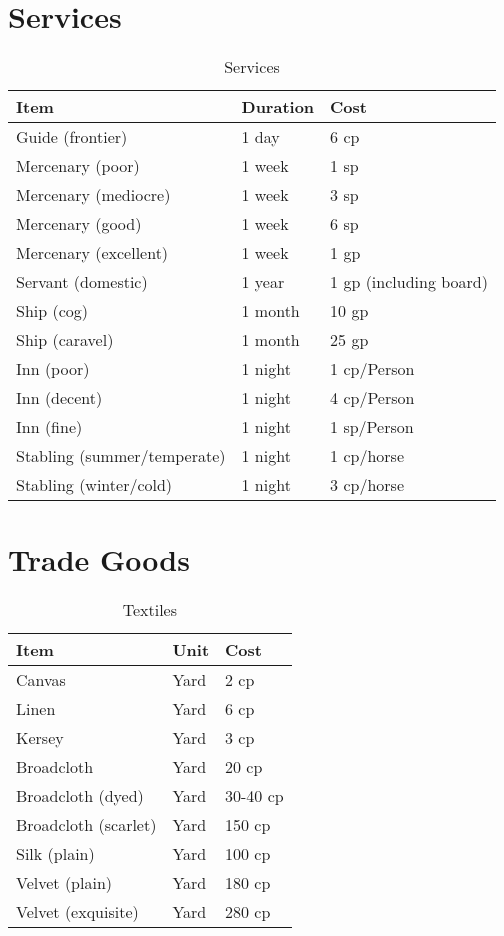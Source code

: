 \documentclass[oneside,11pt,english]{book}
\begin{document}
\section{Services}
\begin{table}[hb]
	\centering
	\caption{Services}
	\label{tab:Services}
	\begin{tabu} spread 0pt {*{3}{X[-1]}}
		Item &Duration &Cost\\\toprule
Guide (frontier) &1 day &6 cp\\
Mercenary (poor) &1 week &1 sp\\
Mercenary (mediocre) &1 week &3 sp\\
Mercenary (good) &1 week &6 sp\\
Mercenary (excellent) &1 week &1 gp\\
Servant (domestic) &1 year &1 gp (including board)\\
Ship (cog) &1 month &10 gp\\
Ship (caravel) &1 month &25 gp\\
Inn (poor) &1 night &1 cp/Person\\
Inn (decent) &1 night &4 cp/Person\\
Inn (fine) &1 night &1 sp/Person\\
Stabling (summer/temperate) &1 night &1 cp/horse\\
Stabling (winter/cold) &1 night &3 cp/horse\\
	\end{tabu}
\end{table}


\section{Trade Goods}
\begin{table}[hb]
	\centering
	\caption{Textiles}
	\label{tab:Textiles}
	\begin{tabu} spread 0pt {*{3}{X[-1]}}
		Item &Unit &Cost\\\toprule
Canvas &Yard &2 cp\\
Linen &Yard &6 cp\\
Kersey &Yard &3 cp\\
Broadcloth &Yard &20 cp\\
Broadcloth (dyed) &Yard &30-40 cp\\
Broadcloth (scarlet) &Yard &150 cp\\
Silk (plain) &Yard &100 cp\\
Velvet (plain) &Yard &180 cp\\
Velvet (exquisite) &Yard &280 cp\\
	\end{tabu}
\end{table}
\end{document}
